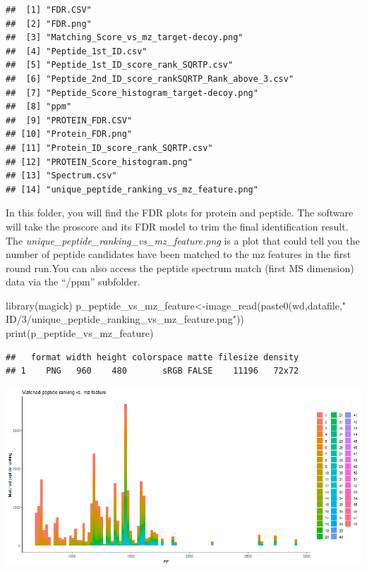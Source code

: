 \documentclass[
]{article}
\newenvironment{Shaded}{\begin{snugshade}}{\end{snugshade}}
\newcommand{\FunctionTok}[1]{\textcolor[rgb]{0.00,0.00,0.00}{#1}}
\newcommand{\NormalTok}[1]{#1}
\newcommand{\OtherTok}[1]{\textcolor[rgb]{0.56,0.35,0.01}{#1}}
\newcommand{\StringTok}[1]{\textcolor[rgb]{0.31,0.60,0.02}{#1}}
\begin{document}
\begin{verbatim}
##  [1] "FDR.CSV"                                        
##  [2] "FDR.png"                                        
##  [3] "Matching_Score_vs_mz_target-decoy.png"          
##  [4] "Peptide_1st_ID.csv"                             
##  [5] "Peptide_1st_ID_score_rank_SQRTP.csv"            
##  [6] "Peptide_2nd_ID_score_rankSQRTP_Rank_above_3.csv"
##  [7] "Peptide_Score_histogram_target-decoy.png"       
##  [8] "ppm"                                            
##  [9] "PROTEIN_FDR.CSV"                                
## [10] "Protein_FDR.png"                                
## [11] "Protein_ID_score_rank_SQRTP.csv"                
## [12] "PROTEIN_Score_histogram.png"                    
## [13] "Spectrum.csv"                                   
## [14] "unique_peptide_ranking_vs_mz_feature.png"
\end{verbatim}

In this folder, you will find the FDR plots for protein and peptide. The
software will take the proscore and its FDR model to trim the final
identification result. The
\emph{unique\_peptide\_ranking\_vs\_mz\_feature.png} is a plot that
could tell you the number of peptide candidates have been matched to the
mz features in the first round run.You can also access the peptide
spectrum match (first MS dimension) data via the ``/ppm'' subfolder.

\begin{Shaded}
\begin{Highlighting}[]
\FunctionTok{library}\NormalTok{(magick)}
\NormalTok{p\_peptide\_vs\_mz\_feature}\OtherTok{\textless{}{-}}\FunctionTok{image\_read}\NormalTok{(}\FunctionTok{paste0}\NormalTok{(wd,datafile,}\StringTok{" ID/3/unique\_peptide\_ranking\_vs\_mz\_feature.png"}\NormalTok{))}
\FunctionTok{print}\NormalTok{(p\_peptide\_vs\_mz\_feature)}
\end{Highlighting}
\end{Shaded}

\begin{verbatim}
##   format width height colorspace matte filesize density
## 1    PNG   960    480       sRGB FALSE    11196   72x72
\end{verbatim}

\includegraphics[width=13.33in]{README_files/figure-latex/FDR plot-1}
\end{document}
